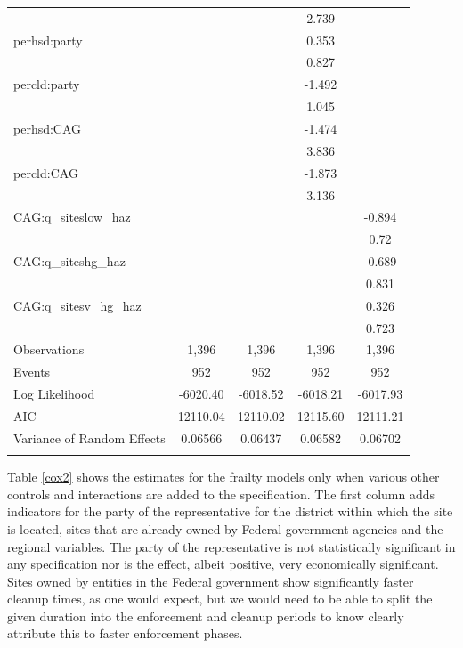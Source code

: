\documentclass[12pt]{article}
\begin{document}
{\begin{table}[!ht]
\begin{tabular}{l|cccc}
        ~ & ~ & ~ & 2.739 & ~ \\ 
        perhsd:party & ~ & ~ & 0.353 & ~ \\ 
        ~ & ~ & ~ & 0.827 & ~ \\ 
        percld:party & ~ & ~ & -1.492 & ~ \\ 
        ~ & ~ & ~ & 1.045 & ~ \\ 
        perhsd:CAG & ~ & ~ & -1.474 & ~ \\ 
        ~ & ~ & ~ & 3.836 & ~ \\ 
        percld:CAG & ~ & ~ & -1.873 & ~ \\ 
        ~ & ~ & ~ & 3.136 & ~ \\ \hline
        CAG:q\_siteslow\_haz & ~ & ~ & ~ & -0.894 \\ 
        ~ & ~ & ~ & ~ & 0.72 \\ 
        CAG:q\_siteshg\_haz & ~ & ~ & ~ & -0.689 \\ 
        ~ & ~ & ~ & ~ & 0.831 \\ 
        CAG:q\_sitesv\_hg\_haz & ~ & ~ & ~ & 0.326 \\ 
        ~ & ~ & ~ & ~ & 0.723 \\ \hline
        Observations & 1,396 & 1,396 & 1,396 & 1,396 \\ 
        Events & 952 & 952 & 952 & 952 \\ 
        Log Likelihood & -6020.40 & -6018.52 & -6018.21 & -6017.93 \\ 
        AIC & 12110.04 & 12110.02 & 12115.60 & 12111.21 \\ 
        Variance of Random Effects & 0.06566 & 0.06437 & 0.06582 & 0.06702 \\ \hline
    	\addlinespace[1ex]
			\multicolumn{3}{l}{\textsuperscript{***}$p\leq0.01$, 
				\textsuperscript{**}$p\leq0.05$, 
				\textsuperscript{*}$p\leq0.01$}
	\end{tabular}
\end{table}

Table \ref{cox2} shows the estimates for the frailty models only when various other controls and interactions are added to the specification. The first column adds indicators for the party of the representative for the district within which the site is located, sites that are already owned by Federal government agencies and the regional variables. The party of the representative is not statistically significant in any specification nor is the effect, albeit positive, very economically significant. Sites owned by entities in the Federal government show significantly faster cleanup times, as one would expect, but we would need to be able to split the given duration into the enforcement and cleanup periods to know clearly attribute this to faster enforcement phases. 

}
\end{document}
